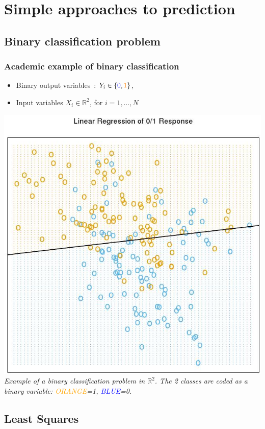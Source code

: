 \documentclass[compress, smaller, serif, 9pt]{beamer}
\begin{document}
\section{Simple approaches to prediction}

\subsection{Binary classification problem}

\begin{frame}
  \frametitle{Academic example of binary classification}
  \begin{itemize}
 \item Binary output variables~: $Y_i \in \{ \textcolor{blue}{0}, \textcolor{orange}{1} \}$,
 \item Input variables  $X_i \in \mathbb{R}^2$, for $i=1,\ldots,N$
\end{itemize}
  \begin{center}
    \includegraphics[width=.5\textwidth]{ex_mc.jpg}\\
    {\it \scriptsize
    Example of a binary classification problem in  $\mathbb{R}^2$. The 2 classes are coded as a binary 
    variable: \textcolor{orange}{ORANGE}=1, \textcolor{blue}{BLUE}=0. }
    \end{center}

\end{frame}


\subsection{Least Squares}
\end{document}
